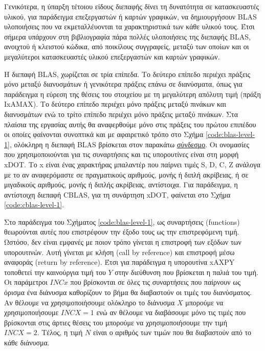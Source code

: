 Γενικότερα, η ύπαρξη τέτοιου είδους διεπαφής δίνει τη δυνατότητα σε κατασκευαστές υλικού, για παράδειγμα επεξεργαστών ή καρτών γραφικών, να δημιουργήσουν BLAS υλοποιήσεις που να εκμεταλλέυονται τα χαρακτηριστικά των κάθε υλικού τους. Έτσι σήμερα υπάρχουν στη βιβλιογραφία πάρα πολλές υλοποιήσεις της διεπαφής BLAS, ανοιχτού ή κλειστού κώδικα, από ποικίλους συγγραφείς, μεταξύ των οποίων και οι μεγαλύτεροι κατασκευαστές υλικού επεξεργαστών και καρτών γραφικών.

Η διεπαφή BLAS, χωρίζεται σε τρία επίπεδα. Το δεύτερο επίπεδο περιέχει πράξεις μόνο μεταξύ διανυσμάτων ή γενικότερα πράξεις επάνω σε διανύσματα, όπως για παράδειγμα η εύρεση της θέσεις του στοιχείου με τη μεγαλύτερη απόλυτη τιμή (πράξη IxAMAX). Το δεύτερο επίπεδο περιέχει μόνο πράξεις μεταξύ πινάκων και διανυσμάτων ενώ το τρίτο επίπεδο περιέχει μόνο πράξεις μεταξύ πινάκων. Στα πλαίσια της εργασίας αυτής θα αναφερθούμε μόνο στις πράξεις του πρώτου επιπέδου οι οποίες φαίνονται συνοπτικά και με αφαιρετικό τρόπο στο Σχήμα \ref{code:blas-level-1}, ολόκληρη η διεπαφή BLAS βρίσκεται στον παρακάτω \href{https://netlib.org/lapack/explore-html/de/da0/cblas_8h_source.html}{σύνδεσμο}. Οι ονομασίες που χρησιμοποιούνται για τις συναρτήσεις και τις υπορουτίνες είναι στη μορφή xDOT. Το x είναι ένας χαρακτήρας μπαλαντέρ που παίρνει τιμές S, D, C, Z ανάλογα με το αν αναφερόμαστε σε πραγματικούς αριθμούς, μονής ή διπλή ακρίβειας, ή σε μιγαδικούς αριθμούς, μονής ή διπλής ακρίβειας, αντίστοιχα. Για παράδειγμα, η αντίστοιχη διεπαφή CBLAS, για τη συνάρτηση xDOT, φαίνεται στο Σχήμα \ref{code:cblas-level-1}.

Στο παράδειγμα του Σχήματος \ref{code:blas-level-1}, ως συναρτήσεις (functions) θεωρούνται αυτές που επιστρέφουν την έξοδο τους ως την επιστρεφόμενη τιμή. Ωστόσο, δεν είναι εμφανές με ποιον τρόπο γίνεται η επιστροφή των εξόδων των υπορουτινών. Αυτή γίνεται με κλήση (call by reference) και επιστροφή μέσω αναφοράς (return by reference). Έτσι για παράδειγμα η υπορουτίνα xAXPY τοποθετεί την καινούργια τιμή του $Y$ στην διεύθυνση που βρίσκεται η παλιά του τιμή. Οι παράμετροι $INCx$ που βρίσκονται σε όλες τις συναρτήσεις που παίρνουν ως όρισμα ένα διάνυσμα καθορίζουν το βήμα θα διαβαστούν οι τιμές του διανύσματος. Αν θέλουμε να χρησιμοποιήσουμε ολόκληρο το διάνυσμα $X$ μπορούμε να χρησιμοποιήσουμε $INCX=1$ ενώ αν θέλουμε να διαβάσουμε μόνο τις τιμές που βρίσκονται στις άρτιες θέσεις του μπορούμε να χρησιμοποιήσουμε την τιμή $INCX=2$. Τέλος, η τιμή $N$ είναι ο αριθμός των τιμών που θα διαβαστούν από το κάθε διάνυσμα.

